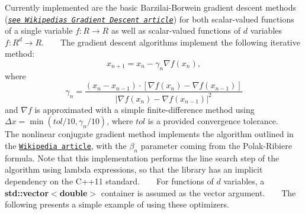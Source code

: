 Currently implemented are the basic Barzilai-\/\+Borwein gradient descent methods ({\itshape \href{https://en.wikipedia.org/wiki/Gradient_descent}{\tt see Wikipedia\textquotesingle{}s \textquotesingle{}Gradient Descent\textquotesingle{} article}}) for both scalar-\/valued functions of a single variable $f:R\longrightarrow R$ as well as scalar-\/valued functions of $d$ variables $ f:R^d\longrightarrow R$. ~\newline
~\newline
 The gradient descent algorithms implement the following iterative method\+: \[ x_{n+1}=x_n-\gamma_n\nabla f(x_n), \] where \[ \gamma_n=\frac{(x_n-x_{n-1})\cdot\left[\nabla f(x_n)-\nabla f(x_{n-1})\right]}{\left|\nabla f(x_n)-\nabla f(x_{n-1})\right|^2} \] and $\nabla f$ is approximated with a simple finite-\/difference method using $\Delta x=\min(tol/10,\gamma_n/10)$, where $tol$ is a provided convergence tolerance. ~\newline
~\newline
 The nonlinear conjugate gradient method implements the algorithm outlined in the \href{https://en.wikipedia.org/wiki/Nonlinear_conjugate_gradient_method}{\tt Wikipedia article}, with the $\beta_n$ parameter coming from the Polak-\/\+Ribiere formula. Note that this implementation performs the line search step of the algorithm using lambda expressions, so that the library has an implicit dependency on the C++11 standard. ~\newline
~\newline
 For functions of $d$ variables, a {\bfseries std\+::vector$<$double$>$} container is assumed as the vector argument. ~\newline
~\newline
 The following presents a simple example of using these optimizers. ~\newline
 
